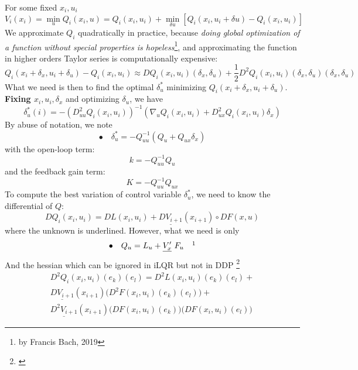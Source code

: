 \documentclass{report}
\begin{document}
For some fixed $x_i,u_i$
\[
V_i(x_i) = \min_u Q_i(x_i,u) = Q_i(x_i, u_i) + \min_{\delta u} [Q_i(x_i,u_i + \delta u) - Q_i(x_i,u_i)]  
\]
We approximate $Q_i$ quadratically in practice, because \emph{doing global optimization of a function without special properties is hopeless}\footnote{by Francis Bach, 2019}, and approximating the function in higher orders Taylor series is computationally expensive: 
\begin{equation}
\label{Q approx}
Q_i(x_i + \delta_x, u_i + \delta_u )- Q_i(x_i,u_i)\approx DQ_i(x_i,u_i)(\delta_x, \delta_u) + \frac{1}{2}D^2 Q_i (x_i,u_i) (\delta_x, \delta_u)(\delta_x, \delta_u)
\end{equation}
What we need is then to find the optimal $\delta_u^*$ minimizing $Q_i(x_i + \delta_x, u_i + \delta_u )$. \textbf{Fixing $x_i,u_i, \delta_x$} and optimizing $\delta_u$, we have
\begin{equation}
    \delta_u^* (i) = -(D^2_{uu}Q_i(x_i, u_i))^{-1} (\nabla_u Q_i(x_i,u_i) + D^2_{ux} Q_i(x_i,u_i) \delta_x)
\end{equation}
By abuse of notation, we note
\begin{equation}
\bullet \quad \delta_u^* = - Q_{uu}^{-1} (Q_u + Q_{ux} \delta_x)
\end{equation}
with the open-loop term:
\begin{equation}
k = - Q_{uu}^{-1} Q_u
\end{equation}
and the feedback gain term:
\begin{equation}
K = - Q_{uu}^{-1} Q_{ux}
\end{equation}
To compute the best variation of control variable $\delta_u^*$, we need to know the differential of $Q$:
\begin{equation}
    D Q_i (x_i, u_i) = DL(x_i,u_i) + \underline{DV_{i+1}}(x_{i+1}) \circ DF(x,u)
\end{equation}
where the unknown is underlined. However, what we need is only
\begin{equation}
\bullet \quad Q_u = L_u + \underline{V'_x}   \ F_u \quad \footnotemark
\end{equation}
And the hessian which can be ignored in iLQR but not in DDP \footnote{\cite{TassaIROS12}} 
\begin{multline}
     D^2 Q_i (x_i ,u_i) (e_k) (e_l) = D^2 L (x_i ,u_i) (e_k) (e_l) + \\
        \underline{DV_{i+1}}(x_{i+1})\big(D^2 F (x_i ,u_i) (e_k) (e_l)\big) +\\
        \underline{D^2 V_{i+1}}(x_{i+1}) \big( DF(x_i ,u_i)(e_k) \big) \big( DF(x_i ,u_i)(e_l) \big)
\end{multline}
\end{document}
